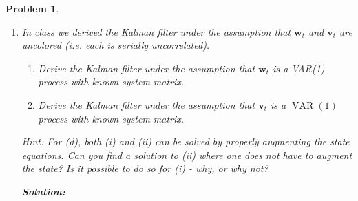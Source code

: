 \documentclass[11pt]{article}
\theoremstyle{plain} %
\newtheorem{problem}[theorem]{Problem}
\newenvironment{solution}
{\color{C2}\normalfont\begin{framed}\begingroup\textbf{Solution:} }
  {\endgroup\end{framed}}
\theoremstyle{remark}
\begin{document}
\begin{problem}
\begin{enumerate}[label=(\alph*)]
\begin{solution}
        \end{solution}
  \item In class we derived the Kalman filter under the assumption that
        $\mathbf{w}_t$ and $\mathbf{v}_t$ are uncolored (i.e. each is serially
        uncorrelated).
        \begin{enumerate}[label=(\roman*)]
          \item Derive the Kalman filter under the assumption that
                $\mathbf{w}_t$ is a VAR(1) process with known system matrix.
          \item Derive the Kalman filter under the assumption that
                $\mathbf{v}_t$ is a $\operatorname{VAR}(1)$ process with known
                system matrix.
        \end{enumerate}
        Hint: For (d), both (i) and (ii) can be solved by properly augmenting
        the state equations. Can you find a solution to (ii) where one does not
        have to augment the state? Is it possible to do so for (i) - why, or why
        not?

        \begin{solution}

        \end{solution}
\end{enumerate}

\end{problem}
\end{document}
